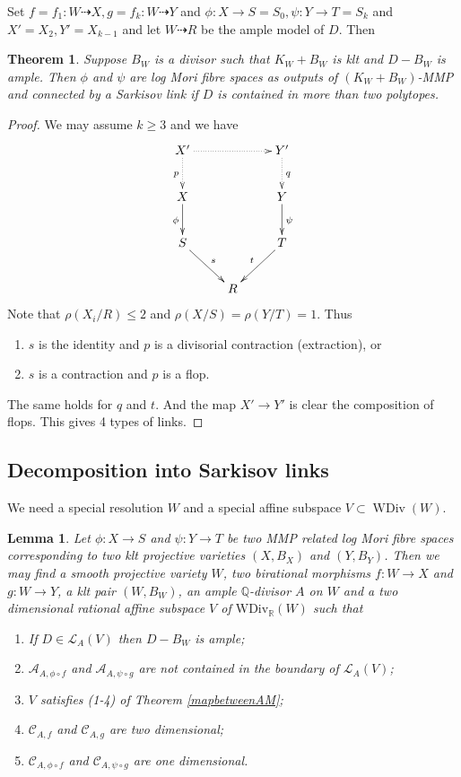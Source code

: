 \documentclass[11pt]{amsart}
\newtheorem{lem}[defn]{Lemma}
\newtheorem{thm}[defn]{Theorem}
\begin{document}
Set $ f=f_1:W\dashrightarrow X, g=f_k:W\dashrightarrow Y $ and $ \phi:X\to S=S_0,\psi:Y\to T=S_k $ and $ X'=X_2,Y'=X_{k-1} $ and let $ W\dashrightarrow R $ be the ample model of $ D $. Then
\begin{thm}\label{constructlink}
  \cite[Theorem 3.7]{haconSarkisovProgram2012} Suppose $ B_W $ is a divisor such that $ K_W+B_W $ is klt and $ D-B_W $ is ample. Then $ \phi $ and $ \psi $ are log Mori fibre spaces as outputs of $ (K_W+B_W) $-MMP and connected by a Sarkisov link if $ D $ is contained in more than two polytopes.
\end{thm}
\begin{proof}
  We may assume $ k\geqslant 3 $ and we have 
  $$ \xymatrix{
  X'\ar@{.>}[d]_p\ar@{.>}[rr]&&Y'\ar@{.>}[d]^q\\
  X\ar[d]_{\phi}&&Y\ar[d]^\psi\\
  S\ar[rd]^s&&T\ar[ld]_t\\
  &R&} $$
Note that $ \rho(X_i/R)\leqslant 2 $ and $ \rho(X/S)=\rho(Y/T)=1 $. Thus 
\begin{enumerate}
  \item $ s $ is the identity and $ p $ is a divisorial contraction (extraction), or
  \item $ s $ is a contraction and $ p $ is a flop.
\end{enumerate}
The same holds for $ q $ and $ t $. And the map $X'\to Y'$ is clear the composition of flops. This gives 4 types of links.
\end{proof}

\subsection{Decomposition into Sarkisov links}
We need a special resolution $W$ and a special  affine subspace $V \subset \operatorname{WDiv}(W)$.

\begin{lem}\label{keylemma}
  \cite[Lemma 4.1]{haconSarkisovProgram2012} Let $ \phi:X\to S $ and $ \psi :Y\to T  $ be two MMP related log Mori fibre spaces corresponding to two klt projective varieties $ (X,B_X) $ and $ (Y,B_Y) $. Then we may find a smooth projective variety $ W $, two birational morphisms $ f:W\to X $ and $ g:W\to Y $, a klt pair $ (W,B_{W}) $, an ample $ \mathbb{Q} $-divisor $ A $ on $ W $ and a two dimensional rational affine subspace $ V $ of $ \mathrm{WDiv}_\mathbb{R}(W) $ such that 
  \begin{enumerate}
    \item If $ D\in \mathcal{L}_A(V) $ then $ D-B_W $ is ample;
    \item $ \mathcal{A}_{A,\phi\circ f} $ and $ \mathcal{A}_{A,\psi\circ g} $ are not contained in the boundary of $ \mathcal{L}_A(V) $;
    \item $ V $ satisfies (1-4) of Theorem \ref{mapbetweenAM};
    \item $ \mathcal{C}_{A,f} $ and $ \mathcal{C}_{A,g} $ are two dimensional;
    \item $ \mathcal{C}_{A,\phi\circ f} $ and $ \mathcal{C}_{A,\psi\circ g} $ are one dimensional.
  \end{enumerate}
\end{lem}
\end{document}
